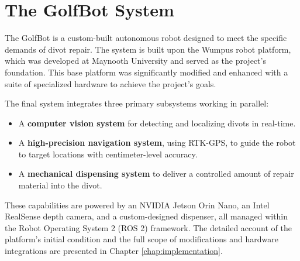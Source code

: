 \section{The GolfBot System}
\label{sec:golfbot_system}

The GolfBot is a custom-built autonomous robot designed to meet the specific demands of divot repair. The system is built upon the Wumpus robot platform, which was developed at Maynooth University and served as the project's foundation. This base platform was significantly modified and enhanced with a suite of specialized hardware to achieve the project's goals.

The final system integrates three primary subsystems working in parallel:
\begin{itemize}
    \item A \textbf{computer vision system} for detecting and localizing divots in real-time.
    \item A \textbf{high-precision navigation system}, using RTK-GPS, to guide the robot to target locations with centimeter-level accuracy.
    \item A \textbf{mechanical dispensing system} to deliver a controlled amount of repair material into the divot.
\end{itemize}
These capabilities are powered by an NVIDIA Jetson Orin Nano, an Intel RealSense depth camera, and a custom-designed dispenser, all managed within the Robot Operating System 2 (ROS 2) framework. The detailed account of the platform's initial condition and the full scope of modifications and hardware integrations are presented in Chapter \ref{chap:implementation}.


